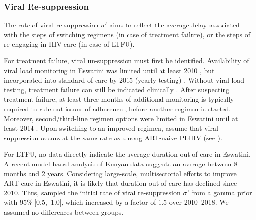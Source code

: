 \subsubsection{Viral Re-suppression}\label{mod.par.cascade.retx}
The rate of viral re-suppression $\sigma'$ aims to reflect the average delay associated with
the steps of switching regimens (in case of treatment failure), or
the steps of re-engaging in HIV care (in case of LTFU).
\par
For treatment failure, viral un-suppression must first be identified.
Availability of viral load monitoring in Eswatini was limited until at least 2010 \cite{EswMOH2010gui},
but incorporated into standard of care by 2015 (yearly testing) \cite{EswMOH2015gui}.
Without viral load testing, treatment failure can still be indicated clinically \cite{EswMOH2010gui}.
After suspecting treatment failure,
at least three months of additional monitoring is typically required
to rule-out issues of adherence \cite{EswMOH2010gui,EswMOH2015gui,EswMOH2018gui},
before another regimen is started.
Moreover, second/third-line regimen options
were limited in Eswatini until at least 2014 \cite{Jobanputra2015,NERCHA2014nsf}.
Upon switching to an improved regimen,  assume that viral suppression occurs
at the same rate as among ART-naive PLHIV (see ).
\par
For LTFU, no data directly indicate the average duration out of care in Eswatini.
A recent model-based analysis of Kenyan data \cite{Bakoyannis2020} suggests
an average between 8 months and 2 years.
Considering large-scale, multisectorial efforts to improve ART care in Eswatini,
it is likely that duration out of care has declined since 2010.
Thus,  sampled the initial rate of viral re-suppression $\sigma'$ from
a gamma prior with 95\% [0.5,~1.0], which increased by a factor of 1.5 over 2010--2018.
We assumed no differences between groups.
